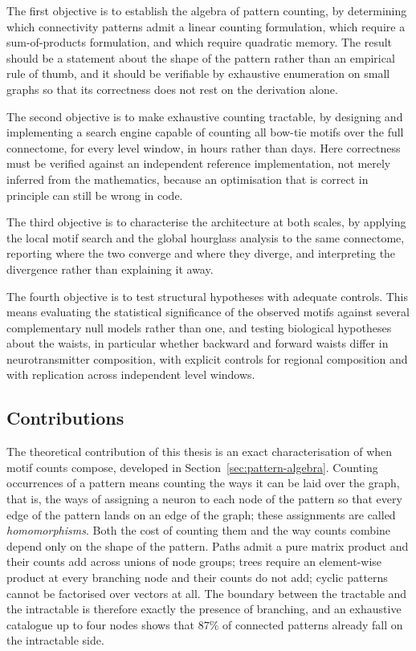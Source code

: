 \documentclass[12pt,a4paper,oneside]{article}
\theoremstyle{definition}
\theoremstyle{plain}
\begin{document}
The first objective is to establish the algebra of pattern counting, by
determining which connectivity patterns admit a linear counting formulation,
which require a sum-of-products formulation, and which require quadratic
memory. The result should be a statement about the shape of the pattern
rather than an empirical rule of thumb, and it should be verifiable by
exhaustive enumeration on small graphs so that its correctness does not rest
on the derivation alone.

The second objective is to make exhaustive counting tractable, by designing
and implementing a search engine capable of counting all bow-tie motifs over
the full connectome, for every level window, in hours rather than days. Here
correctness must be verified against an independent reference
implementation, not merely inferred from the mathematics, because an
optimisation that is correct in principle can still be wrong in code.

The third objective is to characterise the architecture at both scales, by
applying the local motif search and the global hourglass analysis to the
same connectome, reporting where the two converge and where they diverge,
and interpreting the divergence rather than explaining it away.

The fourth objective is to test structural hypotheses with adequate
controls. This means evaluating the statistical significance of the observed
motifs against several complementary null models rather than one, and
testing biological hypotheses about the waists, in particular whether
backward and forward waists differ in neurotransmitter composition,
with explicit controls for regional composition and with replication across
independent level windows.

\subsection{Contributions}
\label{sec:contributions}

The theoretical contribution of this thesis is an exact characterisation of
when motif counts compose, developed in Section~\ref{sec:pattern-algebra}.
Counting occurrences of a pattern means counting the ways it can be laid
over the graph, that is, the ways of assigning a neuron to each node of the
pattern so that every edge of the pattern lands on an edge of the graph;
these assignments are called \emph{homomorphisms}. Both the cost of counting
them and the way counts combine depend only on the shape of the pattern. Paths admit a pure matrix
product and their counts add across unions of node groups; trees require an
element-wise product at every branching node and their counts do not add;
cyclic patterns cannot be factorised over vectors at all. The boundary
between the tractable and the intractable is therefore exactly the presence
of branching, and an exhaustive catalogue up to four nodes shows that
$87\%$ of connected patterns already fall on the intractable side.
\end{document}
